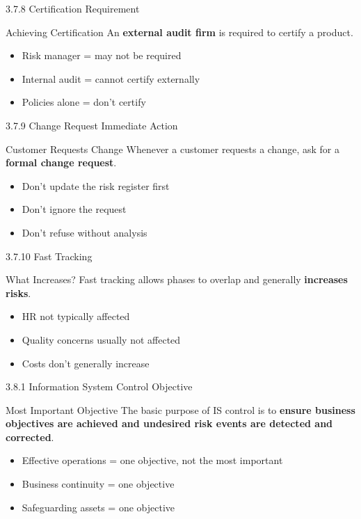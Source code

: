 \documentclass{beamer}
\begin{document}
	\begin{frame}{3.7.8 Certification Requirement}
		\begin{block}{Achieving Certification}
			An \textbf{external audit firm} is required to certify a product.
		\end{block}
		\begin{itemize}
			\item Risk manager = may not be required
			\item Internal audit = cannot certify externally
			\item Policies alone = don't certify
		\end{itemize}
	\end{frame}
	
	\begin{frame}{3.7.9 Change Request Immediate Action}
		\begin{block}{Customer Requests Change}
			Whenever a customer requests a change, ask for a \textbf{formal change request}.
		\end{block}
		\begin{itemize}
			\item Don't update the risk register first
			\item Don't ignore the request
			\item Don't refuse without analysis
		\end{itemize}
	\end{frame}
	
	\begin{frame}{3.7.10 Fast Tracking}
		\begin{block}{What Increases?}
			Fast tracking allows phases to overlap and generally \textbf{increases risks}.
		\end{block}
		\begin{itemize}
			\item HR not typically affected
			\item Quality concerns usually not affected
			\item Costs don't generally increase
		\end{itemize}
	\end{frame}
	
	\begin{frame}{3.8.1 Information System Control Objective}
		\begin{block}{Most Important Objective}
			The basic purpose of IS control is to \textbf{ensure business objectives are achieved and undesired risk events are detected and corrected}.
		\end{block}
		\begin{itemize}
			\item Effective operations = one objective, not the most important
			\item Business continuity = one objective
			\item Safeguarding assets = one objective
		\end{itemize}
	\end{frame}
	
\end{document}
